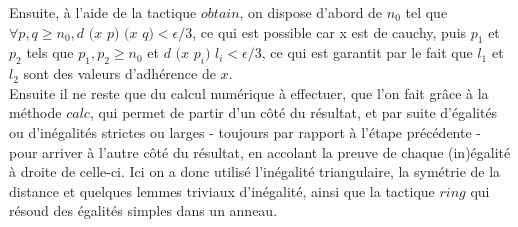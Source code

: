 Ensuite, à l'aide de la tactique $\mathit{obtain}$, on dispose d'abord de $n_0$ tel que $\forall p,q \geq n_0, d$ $(x$ $p)$ $(x$ $q) < \epsilon /3$, ce qui est possible car x est de cauchy, puis $p_1$ et $p_2$ tels que $p_1 , p_2 \geq n_0$ et $d$ $(x$ $p_i)$ $l_i < \epsilon /3$, ce qui est garantit par le fait que $l_1$ et $l_2$ sont des valeurs d'adhérence de $x$.\\
Ensuite il ne reste que du calcul numérique à effectuer, que l'on fait grâce à la méthode $\mathit{calc}$, qui permet de partir d'un côté du résultat, et par suite d'égalités ou d'inégalités strictes ou larges - toujours par rapport à l'étape précédente - pour arriver à l'autre côté du résultat, en accolant la preuve de chaque (in)égalité à droite de celle-ci. Ici on a donc utilisé l'inégalité triangulaire, la symétrie de la distance et quelques lemmes triviaux d'inégalité, ainsi que la tactique $\mathit{ring}$ qui résoud des égalités simples dans un anneau.\\